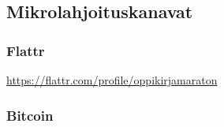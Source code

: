 \newpage


\subsection*{Mikrolahjoituskanavat}

\subsubsection*{Flattr}
\url{https://flattr.com/profile/oppikirjamaraton}


\subsubsection*{Bitcoin}



